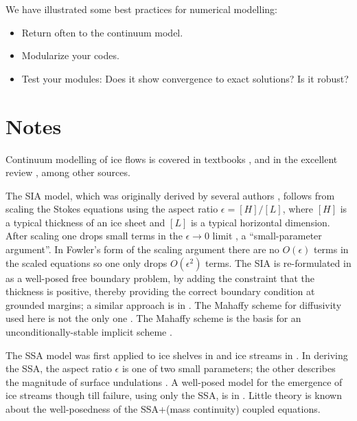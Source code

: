 \documentclass[letterpaper,final,12pt,reqno]{amsart}
\newcommand{\eps}{\epsilon}
\begin{document}
We have illustrated some best practices for numerical modelling:
\begin{itemize}
\item Return often to the continuum model.
\item Modularize your codes.
\item Test your modules:  Does it show convergence to exact solutions?  Is it robust?
\end{itemize}


\section{Notes} \label{sec:nr}

Continuum modelling of ice flows is covered in textbooks \cite{CuffeyPaterson,GreveBlatter2009,vanderVeen}, and in the excellent review \cite{SchoofHewitt2013}, among other sources.

The SIA model, which was originally derived by several authors \cite{FowlerLarson1978,Hutter,MorlandJohnson}, follows from scaling the Stokes equations using the aspect ratio $\eps = [H]/[L]$, where $[H]$ is a typical thickness of an ice sheet and $[L]$ is a typical horizontal dimension.  After scaling one drops small terms in the $\eps\to 0$ limit \cite{Fowler,Hutter}, a ``small-parameter argument''.  In Fowler's form of the scaling argument \cite{Fowler} there are no $O(\eps)$ terms in the scaled equations so one only drops $O(\eps^2)$ terms.  The SIA is re-formulated in \cite{JouvetBueler2012} as a well-posed free boundary problem, by adding the constraint that the thickness is positive, thereby providing the correct boundary condition at grounded margins; a similar approach is in \cite{Bueler2016}.  The Mahaffy \cite{Mahaffy} scheme for diffusivity used here is not the only one \cite{HindmarshPayne}.  The Mahaffy scheme is the basis for an unconditionally-stable implicit scheme \cite{Bueler2016}.

The SSA model \cite{WeisGreveHutter} was first applied to ice shelves in \cite{Morland} and ice streams in \cite{MacAyeal}.  In deriving the SSA, the aspect ratio $\eps$ is one of two small parameters; the other describes the magnitude of surface undulations \cite{SchoofStream,SchoofHindmarsh}.  A well-posed model for the emergence of ice streams though till failure, using only the SSA, is in \cite{SchoofStream}.  Little theory is known about the well-posedness of the SSA+(mass continuity) coupled equations.
\end{document}
